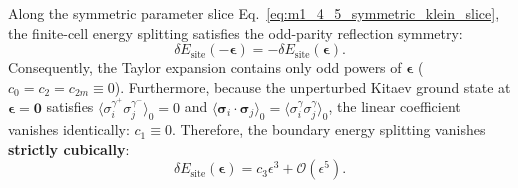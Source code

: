 \begin{theorem}
\label{thm:m1_4_5_klein_cubic_law}
Along the symmetric parameter slice Eq.~\eqref{eq:m1_4_5_symmetric_klein_slice}, the finite-cell energy splitting satisfies the odd-parity reflection symmetry:
\begin{equation}
\label{eq:m1_4_5_klein_odd_parity}
\delta E_{\mathrm{site}}(-\boldsymbol{\epsilon}) = -\delta E_{\mathrm{site}}(\boldsymbol{\epsilon}).
\end{equation}
Consequently, the Taylor expansion contains only odd powers of $\boldsymbol{\epsilon}$ ($c_0 = c_2 = c_{2m} \equiv 0$).
Furthermore, because the unperturbed Kitaev ground state at $\boldsymbol{\epsilon} = \mathbf{0}$ satisfies $\langle \sigma_i^{\gamma^+} \sigma_j^{\gamma^-} \rangle_0 = 0$ and $\langle \boldsymbol{\sigma}_i \cdot \boldsymbol{\sigma}_j \rangle_0 = \langle \sigma_i^\gamma \sigma_j^\gamma \rangle_0$, the linear coefficient vanishes identically: $c_1 \equiv 0$.
Therefore, the boundary energy splitting vanishes \textbf{strictly cubically}:
\begin{equation}
\label{eq:m1_4_5_klein_cubic_scaling}
\delta E_{\mathrm{site}}(\boldsymbol{\epsilon}) = c_3 \epsilon^3 + \mathcal{O}(\epsilon^5).
\end{equation}
\end{theorem}

